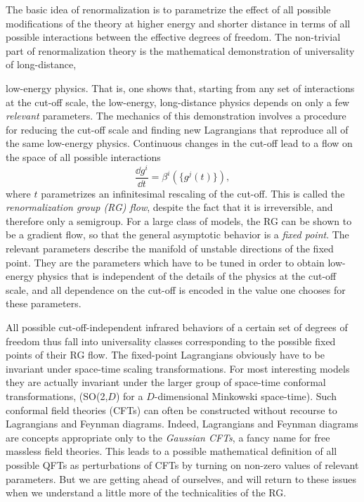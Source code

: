 The basic idea of renormalization is to parametrize the effect of all possible
modifications of the theory at higher energy and shorter distance in terms of
all possible interactions between the effective degrees of freedom. The
non-trivial part of renormalization theory is the mathematical demonstration
of universality of long-distance,

low-energy physics. That is, one shows that, starting from any set of
interactions at the cut-off scale, the low-energy, long-distance physics
depends on only a few \emph{relevant} parameters. The mechanics of this
demonstration involves a procedure for reducing the cut-off scale and finding
new Lagrangians that reproduce all of the same low-energy physics. Continuous
changes in the cut-off lead to a flow on the space of all possible
interactions
\[
  \frac{\dd g^i}{\dd t}=\beta^i(\{g^j(t)\}),
\]
where $t$ parametrizes an infinitesimal rescaling of the cut-off. This is
called the \emph{renormalization group (RG) flow}, despite the fact that it is
irreversible, and therefore only a semigroup. For a large class of models, the
RG can be shown to be a gradient flow, so that the general asymptotic behavior
is a \emph{fixed point}. The relevant parameters describe the manifold of
unstable directions of the fixed point. They are the parameters which have to
be tuned in order to obtain low-energy physics that is independent of the
details of the physics at the cut-off scale, and all dependence on the cut-off
is encoded in the value one chooses for these parameters.


All possible cut-off-independent infrared behaviors of a certain set of
degrees of freedom thus fall into universality classes corresponding to the
possible fixed points of their RG flow. The fixed-point Lagrangians obviously
have to be invariant under space-time scaling transformations. For most
interesting models they are actually invariant under the larger group of
space-time conformal transformations, (SO(2,$D$) for a $D$-dimensional
Minkowski space-time). Such conformal field theories (CFTs) can often be
constructed without recourse to Lagrangians and Feynman diagrams. Indeed,
Lagrangians and Feynman diagrams are concepts appropriate only to the
\emph{Gaussian CFTs}, a fancy name for free massless field theories. This leads
to a possible mathematical definition of all possible QFTs as perturbations of
CFTs by turning on non-zero values of relevant parameters. But we are getting
ahead of ourselves, and will return to these issues when we understand a
little more of the technicalities of the RG.

